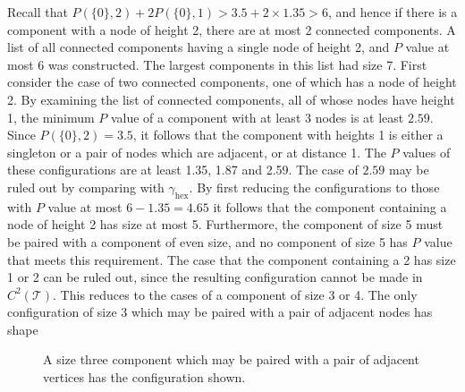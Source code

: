 \documentclass[a4paper, 12pt, notitlepage]{amsart}
\newcommand{\hex}{\operatorname{hex}}
\newcommand{\sT}{\mathscr{T}}
\theoremstyle{remark}
\begin{document}
Recall that $P(\{0\}, 2) + 2 P(\{0\},1) > 3.5 + 2 \times 1.35 > 6$, and hence if there is a component with a node of height 2, there are at most 2 connected components.  A list of all connected components having a single node of height 2, and $P$ value at most 6 was constructed. The largest components in this list had size 7.  First consider the case of two connected components, one of which has a node of height 2. By examining the list of connected components, all of whose nodes have height 1, the minimum $P$ value of a component with at least 3 nodes is at least $2.59$.  Since $P(\{0\}, 2) = 3.5$, it follows that the component with heights 1 is either a singleton or a pair of nodes which are adjacent, or at distance 1.  The $P$ values of these configurations are at least 1.35, 1.87 and 2.59. The case of $2.59$ may be ruled out by comparing with $\gamma_{\hex}$.  By first reducing the configurations to those with $P$ value at most $6-1.35 = 4.65$ it follows that the  component containing a node of height 2 has size at most 5. Furthermore, the component of size 5 must be paired with a component of even size, and no component of size 5 has $P$ value that meets this requirement.  The case that the component containing a 2 has size 1 or 2 can be ruled out, since the resulting configuration cannot be made in $C^2(\sT)$.  This reduces to the cases of a component of size 3 or 4. The only configuration of size 3 which may be paired with a pair of adjacent nodes has shape 

\begin{figure}
\caption{A size three component which may be paired with a pair of adjacent vertices has the configuration shown.}\label{fig:size_3_2_component}
 \end{figure}
 
\end{document}
